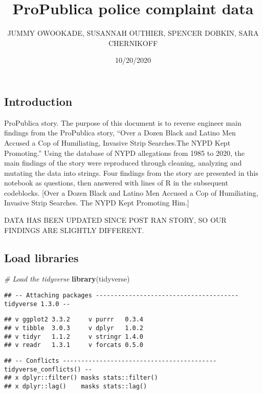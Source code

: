 \documentclass[
]{article}
\title{ProPublica police complaint data}
\author{JUMMY OWOOKADE, SUSANNAH OUTHIER, SPENCER DOBKIN, SARA CHERNIKOFF}
\date{10/20/2020}
\newenvironment{Shaded}{\begin{snugshade}}{\end{snugshade}}
\newcommand{\CommentTok}[1]{\textcolor[rgb]{0.56,0.35,0.01}{\textit{#1}}}
\newcommand{\KeywordTok}[1]{\textcolor[rgb]{0.13,0.29,0.53}{\textbf{#1}}}
\newcommand{\NormalTok}[1]{#1}
\begin{document}
\maketitle

{
\setcounter{tocdepth}{3}
\tableofcontents
}
\hypertarget{introduction}{%
\subsection{Introduction}\label{introduction}}

ProPublica story. The purpose of this document is to reverse engineer
main findings from the ProPublica story, ``Over a Dozen Black and Latino
Men Accused a Cop of Humiliating, Invasive Strip Searches.The NYPD Kept
Promoting.'' Using the database of NYPD allegations from 1985 to 2020,
the main findings of the story were reproduced through cleaning,
analyzing and mutating the data into strings. Four findings from the
story are presented in this notebook as questions, then answered with
lines of R in the subsequent codeblocks. {[}Over a Dozen Black and
Latino Men Accused a Cop of Humiliating, Invasive Strip Searches. The
NYPD Kept Promoting Him.{]}

DATA HAS BEEN UPDATED SINCE POST RAN STORY, SO OUR FINDINGS ARE SLIGHTLY
DIFFERENT.

\hypertarget{load-libraries}{%
\subsection{Load libraries}\label{load-libraries}}

\begin{Shaded}
\begin{Highlighting}[]
\CommentTok{# Load the tidyverse}
\KeywordTok{library}\NormalTok{(tidyverse)}
\end{Highlighting}
\end{Shaded}

\begin{verbatim}
## -- Attaching packages --------------------------------------- tidyverse 1.3.0 --
\end{verbatim}

\begin{verbatim}
## v ggplot2 3.3.2     v purrr   0.3.4
## v tibble  3.0.3     v dplyr   1.0.2
## v tidyr   1.1.2     v stringr 1.4.0
## v readr   1.3.1     v forcats 0.5.0
\end{verbatim}

\begin{verbatim}
## -- Conflicts ------------------------------------------ tidyverse_conflicts() --
## x dplyr::filter() masks stats::filter()
## x dplyr::lag()    masks stats::lag()
\end{verbatim}
\end{document}
